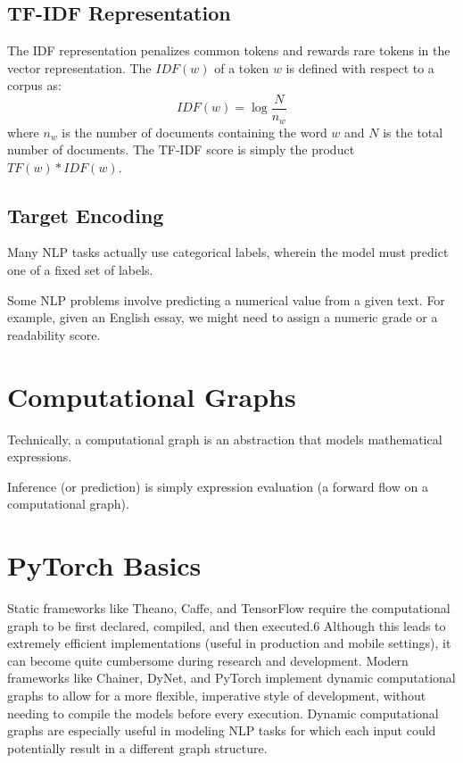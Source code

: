 \subsection{TF-IDF Representation}
The IDF representation penalizes common tokens and rewards rare tokens in the
vector representation. The $IDF(w)$ of a token $w$ is defined with respect to a corpus as:
\begin{equation}
    IDF(w)=\log\frac{N}{n_w}
\end{equation}
where $n_w$ is the number of documents containing the word $w$ and $N$ is the total number of documents. The TF-IDF score is simply the product $TF(w) * IDF(w)$.

\subsection{Target Encoding}
Many NLP tasks actually use categorical labels, wherein the model must predict one
of a fixed set of labels.

Some NLP problems involve predicting a numerical value from a given text. For
example, given an English essay, we might need to assign a numeric grade or a readability score.
\section{Computational Graphs}
Technically, a computational graph is an abstraction that models mathematical expressions.

Inference (or prediction) is simply expression evaluation (a forward flow on a computational graph).

\section{PyTorch Basics}
\begin{tcolorbox}[title=Dynamic Versus Static Computational Graphs]
    Static frameworks like Theano, Caffe, and TensorFlow require the computational
    graph to be first declared, compiled, and then executed.6 Although this leads to
    extremely efficient implementations (useful in production and mobile settings), it can
    become quite cumbersome during research and development. Modern frameworks
    like Chainer, DyNet, and PyTorch implement dynamic computational graphs to
    allow for a more flexible, imperative style of development, without needing to compile the models before every execution. Dynamic computational graphs are especially
    useful in modeling NLP tasks for which each input could potentially result in a different graph structure.
\end{tcolorbox}

